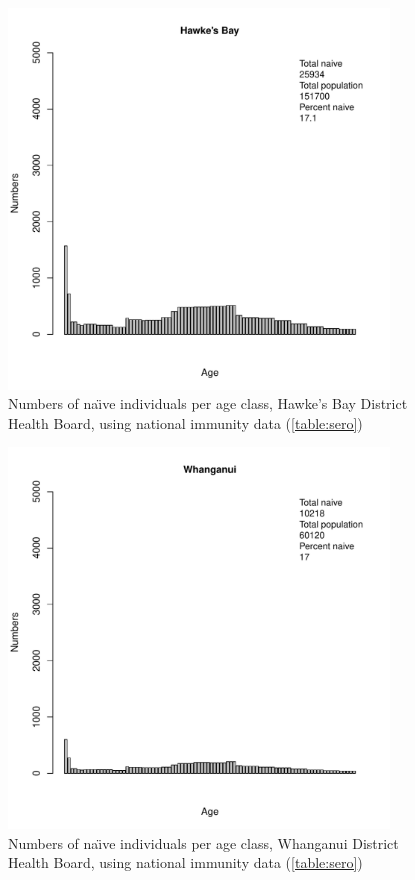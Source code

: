 \documentclass{article}
\begin{document}
\begin{figure}[H]
     \begin{center}
     \includegraphics[width=0.9\textwidth]{dhb10.pdf}
     \end{center}
     \caption{Numbers of na\"{\i}ve individuals per age class, Hawke's Bay District Health Board, using national immunity data (\autoref{table:sero})}
     \label{fig:HawkesBay}
\end{figure}

\begin{figure}[H]
     \begin{center}
     \includegraphics[width=0.9\textwidth]{dhb11.pdf}
     \end{center}
     \caption{Numbers of na\"{\i}ve individuals per age class, Whanganui District Health Board, using national immunity data (\autoref{table:sero})}
     \label{fig:Whanganui}
\end{figure}
\end{document}
